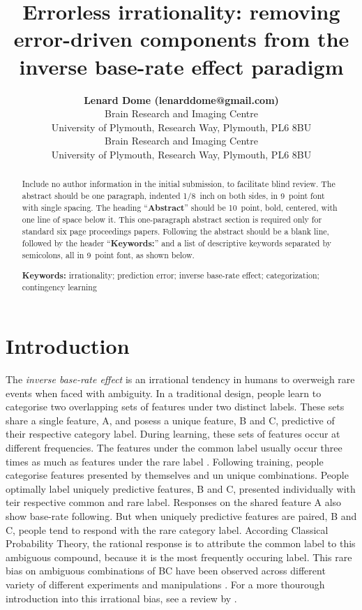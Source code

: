 \documentclass[10pt,letterpaper]{article}
\title{Errorless irrationality: removing error-driven components from the inverse base-rate effect paradigm}
\author{{\large \bf Lenard Dome (lenarddome@gmail.com)} \\
  Brain Research and Imaging Centre \\
  University of Plymouth, Research Way, Plymouth, PL6 8BU
  \AND {\large \bf Andy J. Wills (andy.wills@plymouth.ac.uk)} \\
  Brain Research and Imaging Centre \\
  University of Plymouth, Research Way, Plymouth, PL6 8BU}
\begin{document}
\maketitle

\begin{abstract}
Include no author information in the initial submission, to facilitate
blind review.  The abstract should be one paragraph, indented 1/8~inch on both sides,
in 9~point font with single spacing. The heading ``{\bf Abstract}''
should be 10~point, bold, centered, with one line of space below
it. This one-paragraph abstract section is required only for standard
six page proceedings papers. Following the abstract should be a blank
line, followed by the header ``{\bf Keywords:}'' and a list of
descriptive keywords separated by semicolons, all in 9~point font, as
shown below.

\textbf{Keywords:} 
irrationality; prediction error; inverse base-rate effect; categorization; contingency learning
\end{abstract}


\section{Introduction}

The \textit{inverse base-rate effect} \cite<IBRE, >{medin1988problem} is an irrational tendency in humans to overweigh rare events when faced with ambiguity.
In a traditional design, people learn to categorise two overlapping sets of features under two distinct labels.
These sets share a single feature, A, and posess a unique feature, B and C, predictive of their respective category label.
During learning, these sets of features occur at different frequencies.
The features under the common label usually occur three times as much as features under the rare label \cite{kruschke1996base}.
Following training, people categorise features presented by themselves and un unique combinations.
People optimally label uniquely predictive features, B and C, presented individually with teir respective common and rare label.
Responses on the shared feature A also show base-rate following.
But when uniquely predictive features are paired, B and C, people tend to respond with the rare category label.
According Classical Probability Theory, the rational response is to attribute the common label to this ambiguous compound, because it is the most frequently occuring label.
This rare bias on ambiguous combinations of BC have been observed across different variety of different experiments and manipulations \cite{kalish2001inverse,don2017effects,don2017effects,inkster2022effect,wills2014attention}.
For a more thourough introduction into this irrational bias, see a review by .
\end{document}
